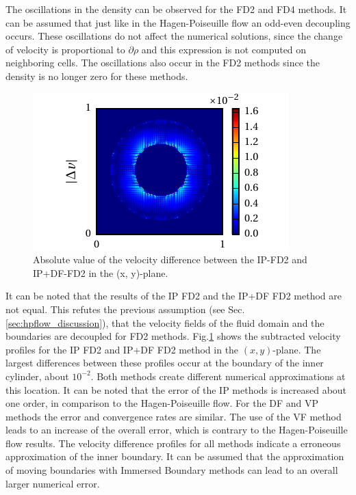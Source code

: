 The oscillations in the density can be observed for the FD2 and FD4 methods.
It can be assumed that just like in the Hagen-Poiseuille flow  an odd-even decoupling occurs.
These oscillations do not affect the numerical solutions, since
the change of velocity is proportional to $\partial \rho$ and this expression is not computed on neighboring cells.
The oscillations also occur in the FD2 methods since the density is no longer zero for these methods.%

\begin{figure}[!bp]
  \begin{minipage}[c]{0.4\textwidth}
      \centering
      \includegraphics{gfx/immersed_boundary/tcflow/discussion/vzdiff.pdf}
  \end{minipage}
  \begin{minipage}[c]{0.6\textwidth}
      \caption{Absolute value of the velocity difference between the IP-FD2 and IP+DF-FD2 in the (x, y)-plane.
      \label{valid:hpflow_velodiff_discussion}
      }
  \end{minipage}
\end{figure}

It can be noted that the results of the IP FD2 and the IP+DF FD2 method are not equal.
This refutes the previous assumption (see Sec. \ref{sec:hpflow_discussion}),
that the velocity fields of the fluid domain and the boundaries are decoupled for FD2 methods.
Fig.\ref{valid:hpflow_velodiff_discussion} shows the subtracted velocity profiles for the IP FD2 and IP+DF FD2 method in the $(x, y)$-plane.
The largest differences between these profiles occur at the boundary of the inner cylinder, about $10^{-2}$.
Both methods create different numerical approximations at this location.
It can be noted that  the error of the IP methods is increased about one order, in comparison to the Hagen-Poiseuille flow.
For the DF and VP methods the error and convergence rates are similar.
The use of the VF method leads to an increase of the overall error, which is contrary to the Hagen-Poiseuille flow results.
The velocity difference profiles for all methods indicate a erroneous approximation of the inner boundary.
It can be assumed that the approximation of moving boundaries with Immersed Boundary methods can
lead to an overall larger numerical error.

